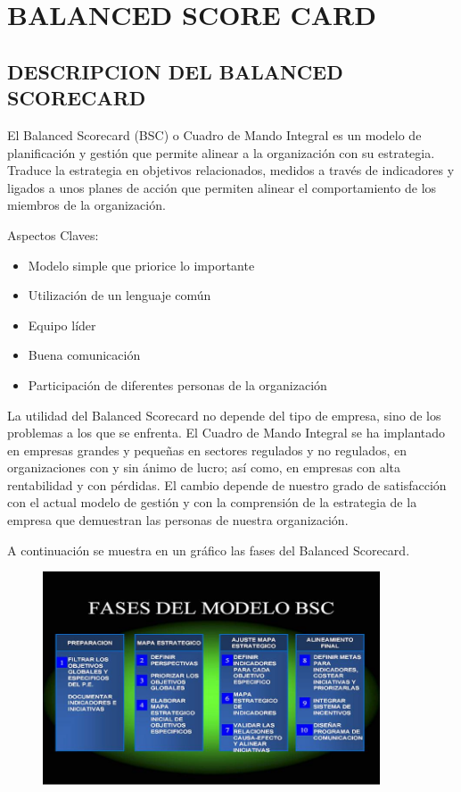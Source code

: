 \section{BALANCED SCORE CARD  } 

\subsection{ DESCRIPCION DEL BALANCED SCORECARD}

	El Balanced Scorecard (BSC) o Cuadro de Mando Integral es un modelo de planificación y gestión que permite alinear a la 			organización con su estrategia. Traduce la estrategia en objetivos relacionados, medidos a través de indicadores y ligados a unos 		planes de acción que permiten alinear el comportamiento de los miembros de la organización.

	Aspectos Claves:
	
	\begin{itemize}
	
		\item  Modelo simple que priorice lo importante
		\item  Utilización de un lenguaje común
		\item  Equipo líder
		\item  Buena comunicación
		\item  Participación de diferentes personas de la organización

	\end{itemize}

	La utilidad del Balanced Scorecard no depende del tipo de empresa, sino de los problemas a los que se enfrenta. El Cuadro de 			Mando Integral se ha implantado en empresas grandes y pequeñas en sectores regulados y no regulados, en organizaciones con 		y sin ánimo de lucro; así como, en empresas con alta rentabilidad y con pérdidas. El cambio depende de nuestro grado de 			satisfacción con el actual modelo de gestión y con la comprensión de la estrategia de la empresa que demuestran las personas de 		nuestra organización.

	A continuación se muestra en un gráfico las fases del Balanced Scorecard.

			\begin{figure}[htb]
				\begin{center}
					\includegraphics[width=10cm]{./Imagenes/1}
				\end{center}
			\end{figure}

